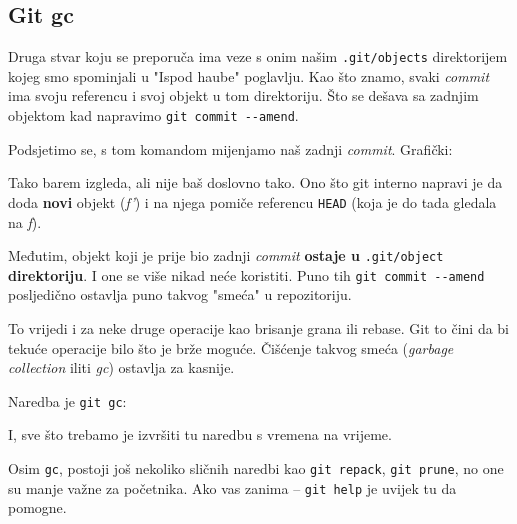 \subsection*{Git gc}

Druga stvar koju se preporuča ima veze s onim našim \verb+.git/objects+ direktorijem kojeg smo spominjali u "Ispod haube" poglavlju.
Kao što znamo, svaki \emph{commit} ima svoju referencu i svoj objekt u tom direktoriju.
Što se dešava sa zadnjim objektom kad napravimo \verb+git commit --amend+.

Podsjetimo se, s tom komandom mijenjamo naš zadnji \emph{commit}.
Grafički:



Tako barem izgleda, ali nije baš doslovno tako.
Ono što git interno napravi je da doda \textbf{novi} objekt (\emph{f'}) i na njega pomiče referencu \verb+HEAD+ (koja je do tada gledala na \emph f).

Međutim, objekt koji je prije bio zadnji \emph{commit} \textbf{ostaje u} \verb+.git/object+ \textbf{direktoriju}.
I one se više nikad neće koristiti.
Puno tih \verb+git commit --amend+ posljedično ostavlja puno takvog "smeća" u repozitoriju.

To vrijedi i za neke druge operacije kao brisanje grana ili rebase.
Git to čini da bi tekuće operacije bilo što je brže moguće.
Čišćenje takvog smeća (\emph{garbage collection} iliti \emph{gc}) ostavlja za kasnije.

Naredba je \verb+git gc+:



I, sve što trebamo je izvršiti tu naredbu s vremena na vrijeme.

Osim \verb+gc+, postoji još nekoliko sličnih naredbi kao \verb+git repack+, \verb+git prune+, no one su manje važne za početnika.
Ako vas zanima -- \verb+git help+ je uvijek tu da pomogne.
